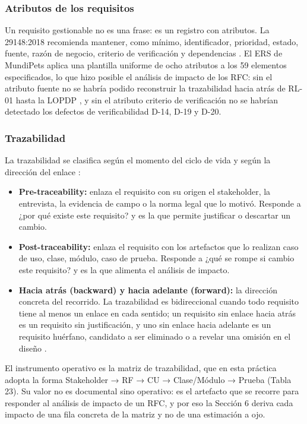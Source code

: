 \documentclass[journal,onecolumn]{IEEEtran}
\begin{document}
	\subsubsection{Atributos de los requisitos}
	
	Un requisito gestionable no es una frase: es un registro con atributos. La 29148:2018 recomienda mantener, como mínimo, identificador, prioridad, estado, fuente, razón de negocio, criterio de verificación y dependencias \cite{ieee29148}. El ERS de MundiPets aplica una plantilla uniforme de ocho atributos a los 59 elementos especificados, lo que hizo posible el análisis de impacto de los RFC: sin el atributo fuente no se habría podido reconstruir la trazabilidad hacia atrás de RL-01 hasta la LOPDP \cite{lopdp}, y sin el atributo criterio de verificación no se habrían detectado los defectos de verificabilidad D-14, D-19 y D-20.
	
	\subsubsection{Trazabilidad}
	
	La trazabilidad se clasifica según el momento del ciclo de vida y según la dirección del enlace \cite{swebok,pohl}:
	
	\begin{itemize}
		\item \textbf{Pre-traceability:} enlaza el requisito con su origen el stakeholder, la entrevista, la evidencia de campo o la norma legal que lo motivó. Responde a ¿por qué existe este requisito? y es la que permite justificar o descartar un cambio.
		\item \textbf{Post-traceability:} enlaza el requisito con los artefactos que lo realizan caso de uso, clase, módulo, caso de prueba. Responde a ¿qué se rompe si cambio este requisito? y es la que alimenta el análisis de impacto.
		\item \textbf{Hacia atrás (backward) y hacia adelante (forward):} la dirección concreta del recorrido. La trazabilidad es bidireccional cuando todo requisito tiene al menos un enlace en cada sentido; un requisito sin enlace hacia atrás es un requisito sin justificación, y uno sin enlace hacia adelante es un requisito huérfano, candidato a ser eliminado o a revelar una omisión en el diseño \cite{wiegers}.
	\end{itemize}
	
	El instrumento operativo es la matriz de trazabilidad, que en esta práctica adopta la forma Stakeholder → RF → CU → Clase/Módulo → Prueba (Tabla 23). Su valor no es documental sino operativo: es el artefacto que se recorre para responder al análisis de impacto de un RFC, y por eso la Sección 6 deriva cada impacto de una fila concreta de la matriz y no de una estimación a ojo.
	
\end{document}
